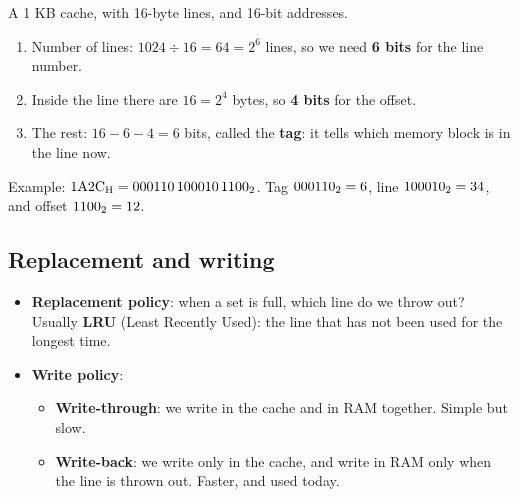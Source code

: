 \begin{khatwa}
    A 1 KB cache, with 16-byte lines, and 16-bit addresses.
    \begin{enumerate}
        \item Number of lines: $1024 \div 16 = 64 = 2^6$ lines, so we need \textbf{6 bits} for the line number.
        \item Inside the line there are $16 = 2^4$ bytes, so \textbf{4 bits} for the offset.
        \item The rest: $16 - 6 - 4 = 6$ bits, called the \textbf{tag}: it tells which memory block is in the line now.
    \end{enumerate}
    \begin{center}
    \end{center}
    Example: $\mbox{1A2C\textsubscript{H}} = \mbox{000110\,100010\,1100\textsubscript{2}}$. Tag $\mbox{000110\textsubscript{2}} = 6$, line $\mbox{100010\textsubscript{2}} = 34$, and offset $\mbox{1100\textsubscript{2}} = 12$.
\end{khatwa}

\subsection{Replacement and writing}
\begin{itemize}
    \item \textbf{Replacement policy}: when a set is full, which line do we throw out? Usually \textbf{LRU} (Least Recently Used):
          the line that has not been used for the longest time.
    \item \textbf{Write policy}:
    \begin{itemize}
        \item \textbf{Write-through}: we write in the cache and in RAM together. Simple but slow.
        \item \textbf{Write-back}: we write only in the cache, and write in RAM only when the line is thrown out. Faster, and used today.
    \end{itemize}
\end{itemize}

